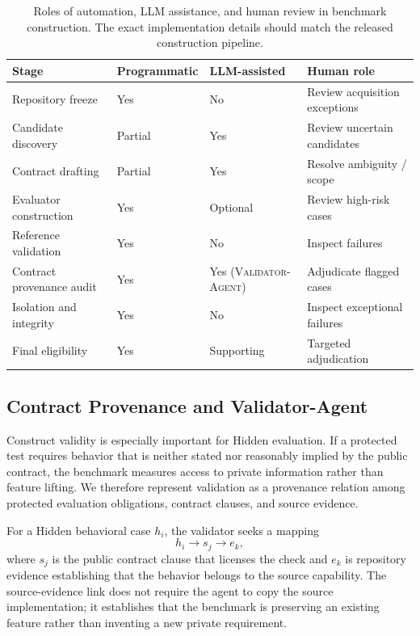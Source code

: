 \documentclass[acmsmall,screen,review,anonymous]{acmart}
\newcommand{\validatoragent}{\textsc{Validator-Agent}\xspace}
\begin{document}
\begin{table}[t]
  \caption{Roles of automation, LLM assistance, and human review in benchmark
  construction. The exact implementation details should match the released
  construction pipeline.}
  \label{tab:construction-roles}
  \centering
  \begin{tabularx}{\textwidth}{@{}p{}p{}p{}X@{}}
    \toprule
    \textbf{Stage} & \textbf{Programmatic} & \textbf{LLM-assisted} & \textbf{Human role} \\
    \midrule
    Repository freeze & Yes & No & Review acquisition exceptions \\
    Candidate discovery & Partial & Yes & Review uncertain candidates \\
    Contract drafting & Partial & Yes & Resolve ambiguity / scope \\
    Evaluator construction & Yes & Optional & Review high-risk cases \\
    Reference validation & Yes & No & Inspect failures \\
    Contract provenance audit & Yes & Yes (\validatoragent) & Adjudicate flagged cases \\
    Isolation and integrity & Yes & No & Inspect exceptional failures \\
    Final eligibility & Yes & Supporting & Targeted adjudication \\
    \bottomrule
  \end{tabularx}
\end{table}

\subsection{Contract Provenance and Validator-Agent}
\label{sec:validator}

Construct validity is especially important for Hidden evaluation. If a protected
test requires behavior that is neither stated nor reasonably implied by the public
contract, the benchmark measures access to private information rather than feature
lifting. We therefore represent validation as a provenance relation among protected
evaluation obligations, contract clauses, and source evidence.

For a Hidden behavioral case $h_i$, the validator seeks a mapping
\begin{equation}
  h_i \rightarrow s_j \rightarrow e_k,
  \label{eq:provenance}
\end{equation}
where $s_j$ is the public contract clause that licenses the check and $e_k$ is
repository evidence establishing that the behavior belongs to the source
capability. The source-evidence link does not require the agent to copy the source
implementation; it establishes that the benchmark is preserving an existing
feature rather than inventing a new private requirement.
\end{document}
